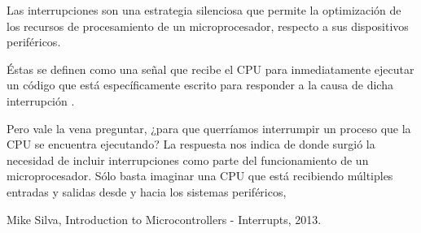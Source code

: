 \documentclass[12pt,a4paper]{report}
\begin{document}
    \vspace{1cm}
       Las interrupciones son una estrategia silenciosa que permite la optimización de los recursos de procesamiento de un microprocesador, respecto a sus dispositivos periféricos.
       
       Éstas se definen como una señal que recibe el CPU para inmediatamente ejecutar un código que está específicamente escrito para responder a la causa de dicha interrupción \cite{Mike Silva 2013}.
       
       Pero vale la vena preguntar, ¿para que querríamos interrumpir un proceso que la CPU se encuentra ejecutando? La respuesta nos indica de donde surgió la necesidad de incluir interrupciones como parte del funcionamiento de un microprocesador. Sólo basta imaginar una CPU que está recibiendo múltiples entradas y salidas desde y hacia los sistemas periféricos, 
       
       
       
    \vspace{1cm}
         
    
        

\begin{thebibliography}{0}



   Mike Silva, Introduction to Microcontrollers - Interrupts, 2013.
\end{thebibliography}
\end{document}
